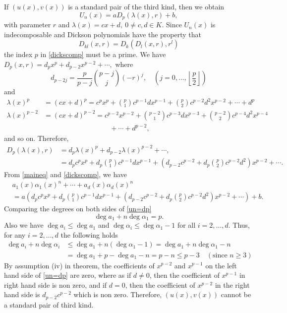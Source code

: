 \documentclass[12pt]{amsart}
\begin{document}
	If $(u(x),v(x))$ is a standard pair of the third kind, then we obtain
	\begin{equation}\label{dickscomp}
		U_n(x)=aD_p(\lambda(x),r)+b,
	\end{equation} with parameter $r$ and $\lambda(x)=cx+d, ~0\neq c,d\in K$.
	Since $U_n(x)$ is indecomposable and Dickson polynomials have the property that
	\[D_{kl}(x,r)=D_k(D_l(x,r),r^l)\] the index $p$ in \eqref{dickscomp} must be a prime. We have
	$D_p(x,r)=d_px^p+d_{p-2}x^{p-2}+\cdots ,$ where $$d_{p-2j}=\frac{p}{p-j}\binom{p-j}{j}(-r)^j,\quad (j=0,\ldots,\left\lfloor \frac{p}{2} \right\rfloor)$$ and 
    \begin{align*}
        \lambda(x)^p&=(cx+d)^p=c^px^{p}+ \binom{p}{1}c^{p-1}d x^{p-1}+\binom{p}{2}c^{p-2}d^2x^{p-2}+\cdots+d^p\\
        \lambda(x)^{p-2}&=(cx+d)^{p-2}=c^{p-2}x^{p-2}+ \binom{p-2}{1}c^{p-3}d x^{p-3}+\binom{p-2}{2}c^{p-4}d^2x^{p-4}\\
        &\hspace{4cm}+\cdots+d^{p-2},
    \end{align*}
and so on. Therefore, 
    \begin{align*}
       D_p(\lambda(x),r)&=d_p\lambda(x)^p+d_{p-2}\lambda(x)^{p-2}+\cdots ,\\
       &=d_pc^px^p+d_p\binom{p}{1}c^{p-1}dx^{p-1}+\left(d_{p-2}c^{p-2}+d_p\binom{p}{2}c^{p-2}d^2\right)x^{p-2}+\cdots .
    \end{align*}From \eqref{maineq} and \eqref{dickscomp}, we have
	\begin{align}\label{un=dp}
&a_1(x)\alpha_1(x)^n+\cdots+a_d(x)\alpha_d(x)^n\\
&=a\left(d_pc^px^p+d_p\binom{p}{1}c^{p-1}dx^{p-1}+(d_{p-2}c^{p-2}+d_p\binom{p}{2}c^{p-2}d^2)x^{p-2}+\cdots\right)+b \nonumber.
	\end{align}
 Comparing the degrees on both sides of \eqref{un=dp}
 \[\deg a_1+n\deg \alpha_1=p.\] Also we have $\deg a_i\leq \deg a_1$ and $\deg \alpha_i\leq \deg \alpha_1-1$ for all $i=2,\ldots,d$. Thus, for any $i=2,\ldots,d$ the following holds 
	\begin{align*}
		\deg a_i+n\deg \alpha_i&\leq \deg a_1+n(\deg \alpha_1-1)=\deg a_1+n\deg \alpha_1-n\\
		&=\deg a_1+p-\deg a_1-n = p-n  \leq p-3 \quad (\text{since }n\geq 3)\nonumber
	\end{align*} By assumption (iv) in theorem, the coefficients of $x^{p-2}$ and $x^{p-1}$ on the left hand side of \eqref{un=dp} are zero, where as if $d\neq 0$, then the coefficient of $x^{p-1}$ in right hand side is non zero, and if $d=0$, then the coefficient of $x^{p-2}$ in the right hand side is $d_{p-2}c^{p-2}$ which is non zero. Therefore, $(u(x),v(x))$ cannot be a standard pair of third kind.
	
\end{document}
